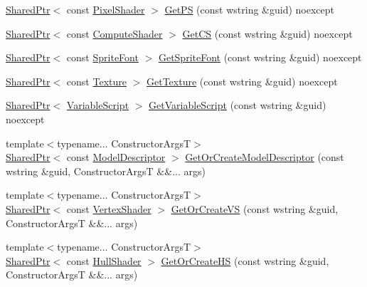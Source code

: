 \begin{DoxyCompactItemize}
\item 
\hyperlink{namespacemage_a1e01ae66713838a7a67d30e44c67703e}{Shared\+Ptr}$<$ const \hyperlink{namespacemage_a27ecaf266420ee7a494d64edc0757129}{Pixel\+Shader} $>$ \hyperlink{classmage_1_1_resource_manager_acf32120f85d46e82d2ddcfc8fe66bea7}{Get\+PS} (const wstring \&guid) noexcept
\item 
\hyperlink{namespacemage_a1e01ae66713838a7a67d30e44c67703e}{Shared\+Ptr}$<$ const \hyperlink{namespacemage_ae040329401484b076f0cd1a7c43d19c9}{Compute\+Shader} $>$ \hyperlink{classmage_1_1_resource_manager_a87967af3f0896373023c858db4a8307b}{Get\+CS} (const wstring \&guid) noexcept
\item 
\hyperlink{namespacemage_a1e01ae66713838a7a67d30e44c67703e}{Shared\+Ptr}$<$ const \hyperlink{classmage_1_1_sprite_font}{Sprite\+Font} $>$ \hyperlink{classmage_1_1_resource_manager_a09d440829037d0469a35ce48ae9ecaee}{Get\+Sprite\+Font} (const wstring \&guid) noexcept
\item 
\hyperlink{namespacemage_a1e01ae66713838a7a67d30e44c67703e}{Shared\+Ptr}$<$ const \hyperlink{classmage_1_1_texture}{Texture} $>$ \hyperlink{classmage_1_1_resource_manager_a2e2f86c3ab9c91900e8f10b94cafb06a}{Get\+Texture} (const wstring \&guid) noexcept
\item 
\hyperlink{namespacemage_a1e01ae66713838a7a67d30e44c67703e}{Shared\+Ptr}$<$ \hyperlink{classmage_1_1_variable_script}{Variable\+Script} $>$ \hyperlink{classmage_1_1_resource_manager_ac54eb6fd61322a66bdc704a88eca192d}{Get\+Variable\+Script} (const wstring \&guid) noexcept
\item 
{\footnotesize template$<$typename... Constructor\+ArgsT$>$ }\\\hyperlink{namespacemage_a1e01ae66713838a7a67d30e44c67703e}{Shared\+Ptr}$<$ const \hyperlink{classmage_1_1_model_descriptor}{Model\+Descriptor} $>$ \hyperlink{classmage_1_1_resource_manager_a02e823df69a151f8a2642bd3ff3140c2}{Get\+Or\+Create\+Model\+Descriptor} (const wstring \&guid, Constructor\+ArgsT \&\&... args)
\item 
{\footnotesize template$<$typename... Constructor\+ArgsT$>$ }\\\hyperlink{namespacemage_a1e01ae66713838a7a67d30e44c67703e}{Shared\+Ptr}$<$ const \hyperlink{classmage_1_1_vertex_shader}{Vertex\+Shader} $>$ \hyperlink{classmage_1_1_resource_manager_ab1a1a4d7e577707b6edf0e068d6c1bff}{Get\+Or\+Create\+VS} (const wstring \&guid, Constructor\+ArgsT \&\&... args)
\item 
{\footnotesize template$<$typename... Constructor\+ArgsT$>$ }\\\hyperlink{namespacemage_a1e01ae66713838a7a67d30e44c67703e}{Shared\+Ptr}$<$ const \hyperlink{namespacemage_a964e5e384b0e55ac900c819da48b6000}{Hull\+Shader} $>$ \hyperlink{classmage_1_1_resource_manager_a7cfe4718a6efd82947368133335bcb47}{Get\+Or\+Create\+HS} (const wstring \&guid, Constructor\+ArgsT \&\&... args)

\end{DoxyCompactItemize}
